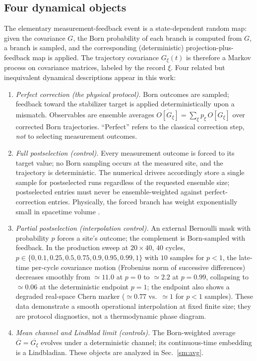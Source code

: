 \documentclass[aps,prl,onecolumn,superscriptaddress,nofootinbib]{revtex4-2}
\newcommand{\avg}[1]{\overline{#1}}
\newcommand{\Gtraj}{G_{\xi}}
\newcommand{\Gbar}{\overline{G}}
\begin{document}
\subsection{Four dynamical objects}

The elementary measurement-feedback event is a state-dependent random map: given the covariance $G$, the Born probability of each branch is computed from $G$, a branch is sampled, and the corresponding (deterministic) projection-plus-feedback map is applied.  The trajectory covariance $\Gtraj(t)$ is therefore a Markov process on covariance matrices, labeled by the record $\xi$.  Four related but inequivalent dynamical descriptions appear in this work:

\begin{enumerate}
\item \emph{Perfect correction (the physical protocol).}  Born outcomes are sampled; feedback toward the stabilizer target is applied deterministically upon a mismatch.  Observables are ensemble averages $\avg{O[\Gtraj]}=\sum_\xi p_\xi\,O[G_\xi]$ over corrected Born trajectories.  ``Perfect'' refers to the classical correction step, \emph{not} to selecting measurement outcomes.

\item \emph{Full postselection (control).}  Every measurement outcome is forced to its target value; no Born sampling occurs at the measured site, and the trajectory is deterministic.  The numerical drivers accordingly store a single sample for postselected runs regardless of the requested ensemble size; postselected entries must never be ensemble-weighted against perfect-correction entries.  Physically, the forced branch has weight exponentially small in spacetime volume \cite{LiZou2023,GarrattAltman2024}.

\item \emph{Partial postselection (interpolation control).}  An external Bernoulli mask with probability $p$ forces a site's outcome; the complement is Born-sampled with feedback.  In the production sweep at $20\times40$, $40$ cycles, $p\in\{0,0.1,0.25,0.5,0.75,0.9,0.95,0.99,1\}$ with $10$ samples for $p<1$, the late-time per-cycle covariance motion (Frobenius norm of successive differences) decreases smoothly from $\simeq11.0$ at $p=0$ to $\simeq2.2$ at $p=0.99$, collapsing to $\simeq0.06$ at the deterministic endpoint $p=1$; the endpoint also shows a degraded real-space Chern marker ($\simeq0.77$ vs.\ $\simeq1$ for $p<1$ samples).  These data demonstrate a smooth operational interpolation at fixed finite size; they are protocol diagnostics, not a thermodynamic phase diagram.

\item \emph{Mean channel and Lindblad limit (controls).}  The Born-weighted average $\Gbar=\avg{\Gtraj}$ evolves under a deterministic channel; its continuous-time embedding is a Lindbladian.  These objects are analyzed in Sec.~\ref{sm:avg}.
\end{enumerate}
\end{document}

